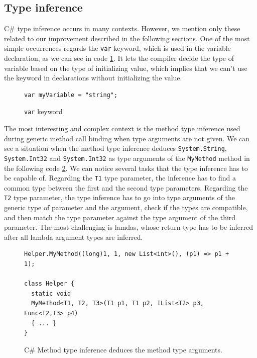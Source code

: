 \subsection{Type inference}

C\# type inference occurs in many contexts. 
However, we mention only these related to our improvement described in the following sections. 
One of the most simple occurrences regards the \texttt{var} keyword, which is used in the variable declaration, as we can see in code \ref{img09:var}. It lets the compiler decide the type of variable based on the type of initializing value, which implies that we can’t use the keyword in declarations without initializing the value.
\par
\begin{figure}
\begin{lstlisting}[style=csharp]
var myVariable = "string";
\end{lstlisting}
\caption{\texttt{var} keyword}
\label{img09:var}
\end{figure}
\par
The most interesting and complex context is the method type inference used during generic method call binding when type arguments are not given. 
We can see a situation when the method type inference deduces \texttt{System.String}, \texttt{System.Int32} and \texttt{System.Int32} as type arguments of the \texttt{MyMethod} method in the following code \ref{img06:typeInference}. 
We can notice several tasks that the type inference has to be capable of.
Regarding the \texttt{T1} type parameter, the inference has to find a common type between the first and the second type parameters. 
Regarding the \texttt{T2} type parameter, the type inference has to go into type arguments of the generic type of parameter and the argument, check if the types are compatible, and then match the type parameter against the type argument of the third parameter. 
The most challenging is lamdas, whose return type has to be inferred after all lambda argument types are inferred.
\par
\begin{figure}
\begin{lstlisting}[style=csharp]
Helper.MyMethod((long)1, 1, new List<int>(), (p1) => p1 + 1);

class Helper {
  static void 
  MyMethod<T1, T2, T3>(T1 p1, T1 p2, IList<T2> p3, Func<T2,T3> p4) 
  { ... }
}
\end{lstlisting}
\caption{C\# Method type inference deduces the method type arguments.}
\label{img06:typeInference}
\end{figure}
